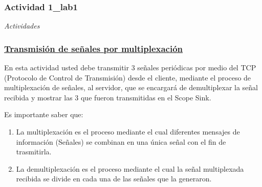 \subsubsection{Actividad 1_lab1}
\begin{frame}


\begin{block}{}
	\centering
	\Large{\textit{Actividades}}
\end{block}
\end{frame}

\begin{frame}


\frametitle{\underline{\textbf{Transmisión de señales por multiplexación}}}

En esta actividad usted debe transmitir 3 señales periódicas por medio del TCP (Protocolo de 	Control de Transmisión) desde el cliente, mediante el proceso de multiplexación de señales, al 	servidor, que se encargará de demultiplexar la señal recibida y mostrar las 3 que fueron  	transmitidas en el Scope Sink.\vspace{2mm}

Es importante saber que:
\begin{enumerate}[1.]
\item {La multiplexación es el proceso mediante el cual diferentes mensajes de información (Señales) se combinan en una única señal con el fin de trasmitirla. }\\

\item {La demultiplexación es el proceso mediante el cual la señal multiplexada recibida se divide en cada una de las señales que la generaron.}\\
\end{enumerate}
\end{frame}


